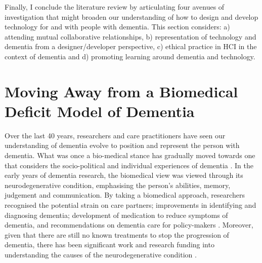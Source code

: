 Finally, I conclude the literature review by articulating four avenues of investigation that might broaden our understanding of how to design and develop technology for and with people with dementia. This section considers: a) attending mutual collaborative relationships, b) representation of technology and dementia from a designer/developer perspective, c) ethical practice in HCI in the context of dementia and d) promoting learning around dementia and technology.

\section{Moving Away from a Biomedical Deficit Model of Dementia}
\label{BL:DementiaHCI}
Over the last 40 years, researchers and care practitioners have seen our understanding of dementia evolve to position and represent the person with dementia. What was once a bio-medical stance has gradually moved towards one that considers the socio-political and individual experiences of dementia \citep{bellass_broadening_2019}. In the early years of dementia research, the biomedical view was viewed through its neurodegenerative condition, emphasising the person's abilities, memory, judgement and communication. By taking a biomedical approach, researchers recognised the potential strain on care partners; improvements in identifying and diagnosing dementia; development of medication to reduce symptoms of dementia, and recommendations on dementia care for policy-makers \citep{doi:10.1080/13607863.2019.1693968}. Moreover, given that there are still no known treatments to stop the progression of dementia, there has been significant work and research funding into understanding the causes of the neurodegenerative condition \citep{bature_signs_2017}.

